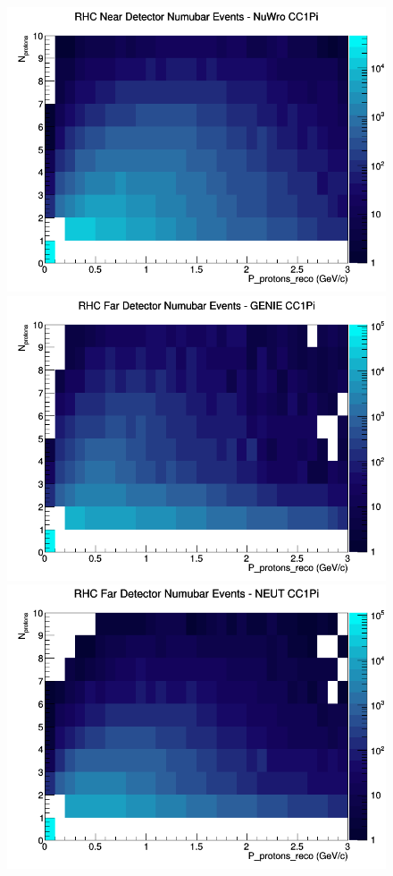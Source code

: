 \documentclass[12pt]{article}
\begin{document}
\begin{figure}[h]
\includegraphics[width=\linewidth]{eff_N_P/LAr/protons/CC1Pi_RHC_ND_numubar_N_P_NuWro.png}
\endminipage
\newline
{}
\includegraphics[width=\linewidth]{eff_N_P/LAr/protons/CC1Pi_RHC_FD_numubar_N_P_GENIE.png}
\endminipage
{}
\includegraphics[width=\linewidth]{eff_N_P/LAr/protons/CC1Pi_RHC_FD_numubar_N_P_NEUT.png}

\end{figure}
\end{document}
